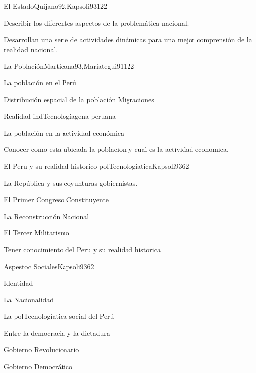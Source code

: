 \begin{syllabus}
\begin{unit}{El Estado}{Quijano92,Kapsoli93}{12}{2}
\begin{unitgoals}
      \item Describir los diferentes aspectos de la problemática nacional.
      \item Desarrollan una serie de actividades dinámicas para una mejor comprensión de la realidad nacional.
   \end{unitgoals}
\end{unit}

\begin{unit}{La Población}{Marticona93,Mariategui91}{12}{2}
\begin{topics}
	\item La población en el Perú
	\item Distribución espacial de la población Migraciones
	\item Realidad indTecnologíagena peruana
	\item La población en la actividad económica
\end{topics}

\begin{unitgoals}
      \item Conocer como esta ubicada la poblacion y cual es la actividad economica.
   \end{unitgoals}
\end{unit}

\begin{unit}{El Peru y su realidad historico polTecnologíatica}{Kapsoli93}{6}{2}
\begin{topics}
	\item La República y sus coyunturas gobiernistas.
	\item El Primer Congreso Constituyente
	\item La Reconstrucción Nacional
	\item El Tercer Militarismo
\end{topics}

\begin{unitgoals}
      \item Tener conocimiento del Peru y su realidad historica
\end{unitgoals}
\end{unit}

\begin{unit}{Aspestoc Sociales}{Kapsoli93}{6}{2}
\begin{topics}
	\item Identidad
	\item La Nacionalidad
	\item La polTecnologíatica social del Perú
	\item Entre la democracia y la dictadura
	\item Gobierno Revolucionario
	\item Gobierno Democrático
\end{topics}


\end{unit}
\end{syllabus}
